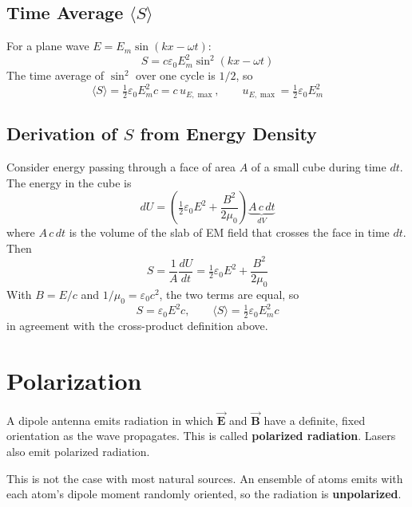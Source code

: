 \documentclass[11pt]{report}
\newcommand{\vbf}[1]{\vec{\mathbf{#1}}}
\begin{document}
\subsection*{Time Average $\langle S\rangle$}

For a plane wave $E = E_m\sin(kx-\omega t)$:
\begin{equation}
S = c\varepsilon_0 E_m^2 \sin^2(kx-\omega t)
\end{equation}
The time average of $\sin^2$ over one cycle is $1/2$, so
\begin{equation}
\boxed{\langle S\rangle = \tfrac{1}{2}\varepsilon_0 E_m^2 c = c\, u_{E,\max}, \qquad u_{E,\max} = \tfrac{1}{2}\varepsilon_0 E_m^2}
\end{equation}

\subsection*{Derivation of $S$ from Energy Density}

Consider energy passing through a face of area $A$ of a small cube during time $dt$. The energy in the cube is
\begin{equation}
dU = \left(\tfrac{1}{2}\varepsilon_0 E^2 + \frac{B^2}{2\mu_0}\right)\underbrace{A\,c\,dt}_{dV}
\end{equation}
where $A\,c\,dt$ is the volume of the slab of EM field that crosses the face in time $dt$. Then
\begin{equation}
S = \frac{1}{A}\frac{dU}{dt} = \tfrac{1}{2}\varepsilon_0 E^2 + \frac{B^2}{2\mu_0}
\end{equation}
With $B = E/c$ and $1/\mu_0 = \varepsilon_0 c^2$, the two terms are equal, so
\begin{equation}
S = \varepsilon_0 E^2 c, \qquad \langle S\rangle = \tfrac{1}{2}\varepsilon_0 E_m^2 c
\end{equation}
in agreement with the cross-product definition above.

\section{Polarization}

A dipole antenna emits radiation in which $\vbf{E}$ and $\vbf{B}$ have a definite, fixed orientation as the wave propagates. This is called \textbf{polarized radiation}. Lasers also emit polarized radiation.

This is not the case with most natural sources. An ensemble of atoms emits with each atom's dipole moment randomly oriented, so the radiation is \textbf{unpolarized}.
\end{document}
